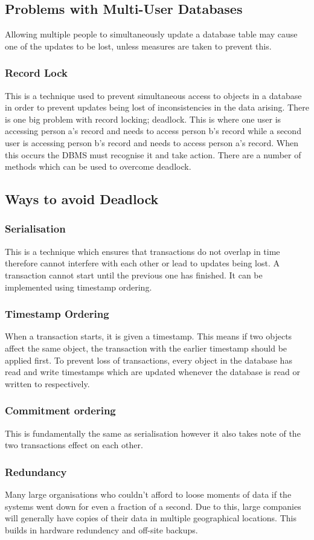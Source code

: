 \documentclass[a4paper,11pt, twocolumn]{article}
\begin{document}
\subsection{Problems with Multi-User Databases}
Allowing multiple people to simultaneously update a database table may cause one of the updates to be lost, unless measures are taken to prevent this. 
\subsubsection{Record Lock}
This is a technique used to prevent simultaneous access to objects in a database in order to prevent updates being lost of inconsistencies in the data arising. There is one big problem with record locking; deadlock. This is where one user is accessing person a's record and needs to access person b's record while a second user is accessing person b's record and needs to access person a's record. When this occurs the DBMS must recognise it and take action. There are a number of methods which can be used to overcome deadlock.
\subsection{Ways to avoid Deadlock}
\subsubsection{Serialisation}
This is a technique which ensures that transactions do not overlap in time therefore cannot interfere with each other or lead to updates being lost. A transaction cannot start until the previous one has finished. It can be implemented using timestamp ordering.
\subsubsection{Timestamp Ordering}
When a transaction starts, it is given a timestamp. This means if two objects affect the same object, the transaction with the earlier timestamp should be applied first. To prevent loss of transactions, every object in the database has read and write timestamps which are updated whenever the database is read or written to respectively. 
\subsubsection{Commitment ordering}
This is fundamentally the same as serialisation however it also takes note of the two transactions effect on each other.
\subsubsection{Redundancy}
Many large organisations who couldn't afford to loose moments of data if the systems went down for even a fraction of a second. Due to this, large companies will generally have copies of their data in multiple geographical locations. This builds in hardware redundency and off-site backups.
\end{document}
